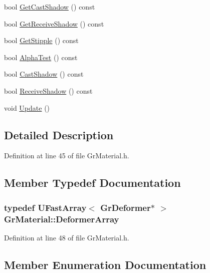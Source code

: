 \begin{CompactItemize}
\begin{CompactItemize}
\item 
bool \hyperlink{class_gr_material_1d5920d3a45dfcf1f233209ec74c5fa8}{GetCastShadow} () const 
\item 
bool \hyperlink{class_gr_material_eb0504c0f3e86635d4a0b56745beab79}{GetReceiveShadow} () const 
\item 
bool \hyperlink{class_gr_material_1a03f69a955aaf5d8a2c6094685a710a}{GetStipple} () const 
\item 
bool \hyperlink{class_gr_material_25a173f7ea53817987aca0ff8924112a}{AlphaTest} () const 
\item 
bool \hyperlink{class_gr_material_9f2498b4265e1c59a1abdaf03792b23a}{CastShadow} () const 
\item 
bool \hyperlink{class_gr_material_c4ef3f9a72931e59ce603dc68b2d1317}{ReceiveShadow} () const 
\item 
void \hyperlink{class_gr_material_c03bcd63f4d03a169dfe91ddcea07a12}{Update} ()
\end{CompactItemize}


\subsection{Detailed Description}


Definition at line 45 of file GrMaterial.h.

\subsection{Member Typedef Documentation}
\hypertarget{class_gr_material_3c4945ac4c9276c13a3737a9223c479c}{
\subsubsection[{DeformerArray}]{\setlength{\rightskip}{0pt plus 5cm}typedef {\bf UFastArray}$<$ {\bf GrDeformer}$\ast$ $>$ {\bf GrMaterial::DeformerArray}}}
\label{class_gr_material_3c4945ac4c9276c13a3737a9223c479c}




Definition at line 48 of file GrMaterial.h.

\subsection{Member Enumeration Documentation}
\hypertarget{class_gr_material_0277ae85793f8cce8f8e3939fb5540e9}{
}
\end{CompactItemize}
